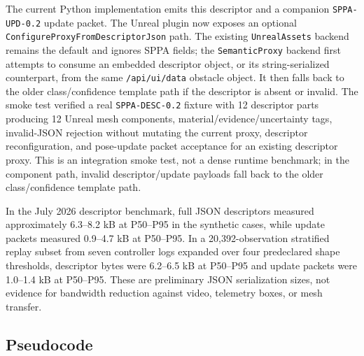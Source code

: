 ﻿\documentclass[11pt,a4paper]{article}
\begin{document}
The current Python implementation emits this descriptor and a companion
\texttt{SPPA-UPD-0.2} update packet. The Unreal plugin now exposes an optional
\texttt{ConfigureProxyFromDescriptorJson} path. The existing \texttt{UnrealAssets}
backend remains the default and ignores SPPA fields; the \texttt{SemanticProxy}
backend first attempts to consume an embedded descriptor object, or its
string-serialized counterpart, from the same \texttt{/api/ui/data} obstacle
object. It then falls back to the older class/confidence template path if the
descriptor is absent or invalid. The smoke test verified a real
\texttt{SPPA-DESC-0.2} fixture with 12 descriptor parts producing 12 Unreal
mesh components, material/evidence/uncertainty tags, invalid-JSON rejection
without mutating the current proxy, descriptor reconfiguration, and pose-update
packet acceptance for an existing descriptor proxy. This is an integration
smoke test, not a dense runtime benchmark; in the component path, invalid
descriptor/update payloads fall back to the older class/confidence template path.

In the July 2026 descriptor benchmark,
full JSON descriptors measured approximately 6.3--8.2 kB at P50--P95 in the
synthetic cases, while update packets measured 0.9--4.7 kB at P50--P95. In a
20,392-observation stratified replay subset from seven controller logs expanded
over four predeclared shape thresholds, descriptor bytes were 6.2--6.5 kB at
P50--P95 and update packets were 1.0--1.4 kB at P50--P95.
These are preliminary JSON serialization sizes, not evidence for bandwidth reduction
against video, telemetry boxes, or mesh transfer.

\subsection{Pseudocode}
\end{document}
